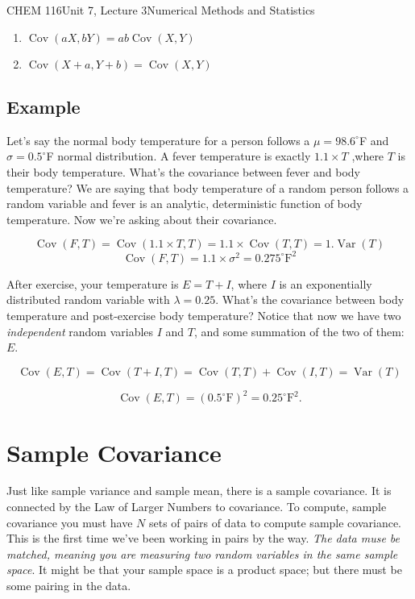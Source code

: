 \documentclass{article}
\DeclareMathOperator{\Var}{Var}
\DeclareMathOperator{\Cov}{Cov}
\begin{document}
\begin{tdoc}{CHEM 116}{Unit 7, Lecture 3}{Numerical Methods and Statistics}
\begin{enumerate}
\item $\Cov(aX, bY) = ab\Cov(X,Y)$\\

\item $\Cov(X + a, Y + b) = \Cov(X,Y)$\\

\end{enumerate}

\subsection{Example}

Let's say the normal body temperature for a person follows a $\mu = 98.6 ^{\circ}$F and $\sigma=0.5 ^{\circ}$F normal distribution. A fever temperature is exactly $1.1\times T$ ,where $T$ is their body temperature. What's the covariance between fever and body temperature? We are saying that body temperature of a random person follows a random variable and fever is an analytic, deterministic function of body temperature. Now we're asking about their covariance.

\[
\Cov(F, T) = \Cov(1.1\times T, T) = 1.1\times \Cov(T, T) = 1. \Var(T)
\]
\[
\Cov(F,T) = 1.1\times \sigma^2 = 0.275^\circ \textrm{F}^2
\]

After exercise, your temperature is $E = T + I$, where $I$ is an
exponentially distributed random variable with $\lambda =0.25$. What's the covariance between body temperature and post-exercise body temperature? Notice that now we have two \textit{independent} random variables $I$ and $T$, and some summation of the two of them: $E$.

\[
\Cov(E, T) = \Cov(T + I, T) = \Cov(T, T) + \Cov(I, T) = \Var(T)
\]

\[
\Cov(E, T) = (0.5^\circ \textrm{F})^2 = 0.25 ^\circ \textrm{F}^2.
\]

\section{Sample Covariance}

Just like sample variance and sample mean, there is a sample
covariance. It is connected by the Law of Larger Numbers to covariance. To compute, sample covariance you must have $N$ sets of pairs of data to compute sample
covariance. This is the first time we've been working in pairs by the
way. \textit{The data muse be matched, meaning you are measuring two random
variables in the same sample space}. It might be that your sample space
is a product space; but there must be some pairing in the data.


\end{tdoc}
\end{document}
